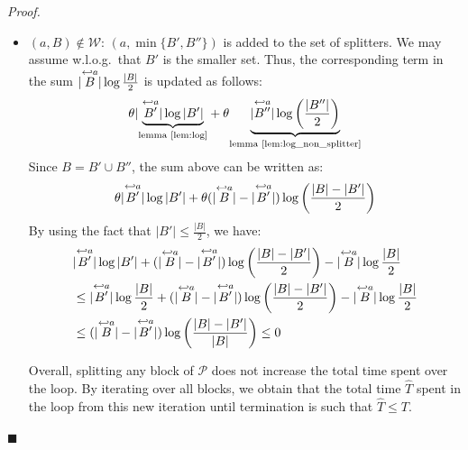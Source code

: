 \documentclass[12pt, a4 paper]{article}
\renewenvironment{proof}[1][Proof]{\begin{mdframed}[backgroundcolor=black!5, topline=false, rightline=false, bottomline=false, linecolor=black!15, linewidth=3pt]{\noindent\textit{#1.}\ }}{\noindent\par\hfill$\blacksquare$\end{mdframed}}
\theoremstyle{definition}
\begin{document}
\begin{proof}
\begin{itemize}
        \item $(a, B) \notin \mathcal{W}$: $(a, \min\{B', B''\})$ is added to the set of splitters. We may assume w.l.o.g.\ that $B'$ is the smaller set.
        Thus, the corresponding term in the sum $|\overset{\hookleftarrow {a}}{B}| \log \frac{| B |}{2}$ is updated as follows:
        \begin{equation*}
            \theta | \underset{\text{lemma \ref{lem:log}}}{\underbrace{\overset{\hookleftarrow {a}}{B'} | \log | B' |}} + \theta \underset{\text{lemma \ref{lem:log_non_splitter}}}{\underbrace{|\overset{\hookleftarrow {a}}{B''} | \log \left(\frac{| B'' |}{2}\right)}}
        \end{equation*}
        Since $B = B' \cup B''$, the sum above can be written as:
        \begin{equation*}
            \theta | \overset{\hookleftarrow {a}}{B'} | \log | B' | + \theta (| \overset{\hookleftarrow {a}}{B} | - | \overset{\hookleftarrow {a}}{B'} |) \log \left(\frac{|B|-|B'|}{2}\right)
        \end{equation*}
        By using the fact that $\displaystyle{| B' | \leq \frac{|B|}{2}}$, we have:
        \begin{align*}
            & | \overset{\hookleftarrow {a}}{B'} | \log | B'| + (| \overset{\hookleftarrow {a}}{B} | - | \overset{\hookleftarrow {a}}{B'}|)\log \left(\frac{| B | - |B'|}{2} \right) - |\overset{\hookleftarrow {a}}{B}| \log \frac{|B|}{2} \\
            & \leq | \overset{\hookleftarrow {a}}{B'}| \log \frac{| B |}{2} + (| \overset{\hookleftarrow {a}}{B}| - | \overset{\hookleftarrow {a}}{B'}|) \log \left(\frac{|B| - |B'|}{2}\right) - | \overset{\hookleftarrow {a}}{B}| \log \frac{| B |}{2} \\
            & \leq (| \overset{\hookleftarrow {a}}{B}| - | \overset{\hookleftarrow {a}}{B'} |) \log \left(\frac{| B | - | B' |}{| B |}\right) \leq 0
        \end{align*}

        Overall, splitting any block of $\mathcal{P}$ does not increase the total time spent over the loop.
        By iterating over all blocks, we obtain that the total time $\hat{T}$ spent in the loop from this new iteration until termination is such that $\hat{T} \leq T$.
    \end{itemize}
\end{proof}

\bigskip
\end{document}
